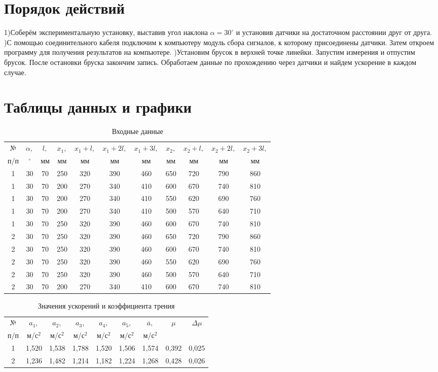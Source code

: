 \documentclass[12pt]{article}
\begin{document}
	\section{Порядок действий}
	1)Соберём экспериментальную установку, выставив угол наклона $\alpha=30^{\circ}$ и установив датчики на достаточном расстоянии друг от друга.
	)С помощью соединительного кабеля подключим к компьютеру модуль
	сбора сигналов, к которому присоединены датчики. Затем откроем программу для получения результатов на компьютере.
	)Установим брусок в верхней точке линейки. Запустим измерения и отпустим брусок. После остановки бруска закончим запись. Обработаем
	данные по прохождению через датчики и найдем ускорение в каждом случае.
	\section{Таблицы данных и графики}
		\begin{table}[h]
		\caption{Входные данные}
		\begin{tabular}{|c|c|c|c|c|c|c|c|c|c|c|}
			\hline
			№&$\alpha,$&$l,$&$x_1,$&$x_1+l,$&$x_1+2l,$&$x_1+3l,$&$x_2,$&$x_2+l,$&$x_2+2l,$&$x_2+3l,$\\
			п/п&$^{\circ}$&мм&мм&мм&мм&мм&мм&мм&мм&мм\\
			\hline
			1&30&70&250&320&390&460&650&720&790&860\\
			1&30&70&200&270&340&410&600&670&740&810\\
			1&30&70&200&270&340&410&550&620&690&760\\
			1&30&70&200&270&340&410&500&570&640&710\\
			1&30&70&250&320&390&460&600&670&740&810\\
			\hline
			2&30&70&250&320&390&460&650&720&790&860\\
			2&30&70&250&320&390&460&600&670&740&810\\
			2&30&70&250&320&390&460&550&620&690&760\\
			2&30&70&250&320&390&460&500&570&640&710\\
			2&30&70&200&270&340&410&600&670&740&810\\
			\hline
		\end{tabular}
	\end{table}
	\begin{table}[h!]
		\caption{Значения ускорений и коэффициента трения}
		\begin{tabular}{|c|c|c|c|c|c|c|c|c|}
			\hline
			№&$a_1,$&$a_2,$&$a_3,$&$a_4,$&$a_5,$&$\overline{a},$&$\mu$&$\Delta\mu$\\
			п/п&м/с$^2$&м/с$^2$&м/с$^2$&м/с$^2$&м/с$^2$&м/с$^2$&&\\
			\hline
			1&1,520&1,538&1,788&1,520&1,506&1,574&0,392&0,025\\
			2&1,236&1,482&1,214&1,182&1,224&1,268&0,428&0,026\\
			\hline
		\end{tabular}
	\end{table}
\end{document}
